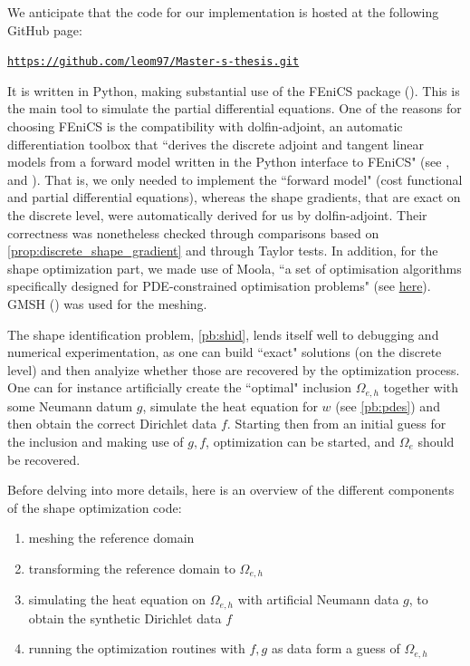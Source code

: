 \documentclass[english,a4paper,10pt,oneside]{scrbook}	%
\theoremstyle{break}
\theoremstyle{remark}
\begin{document}
We anticipate that the code for our implementation is hosted at the following GitHub page: 
\begin{center}
\href{https://github.com/leom97/Master-s-thesis.git}{\texttt{https://github.com/leom97/Master-s-thesis.git}}
\end{center}
It is written in Python, making substantial use of the FEniCS package (\cite{fenics}). This is the main tool to simulate the partial differential equations. One of the reasons for choosing FEniCS is the compatibility with dolfin-adjoint, an automatic differentiation toolbox that ``derives the discrete adjoint and tangent linear models from a forward model written in the Python interface to FEniCS" (see \cite{dolfin-adjoint_1}, \cite{dolfin-adjoint_2} and \cite{dolfin-adjoint_3}). That is, we only needed to implement the ``forward model" (cost functional and partial differential equations), whereas the shape gradients, that are exact on the discrete level, were automatically derived for us by dolfin-adjoint. Their correctness was nonetheless checked through comparisons based on \cref{prop:discrete_shape_gradient} and through Taylor tests. In addition, for the shape optimization part, we made use of Moola, ``a set of optimisation algorithms specifically designed for PDE-constrained optimisation problems" (see \href{https://github.com/funsim/moola}{here}). GMSH (\cite{gmsh}) was used for the meshing.

The shape identification problem, \cref{pb:shid}, lends itself well to debugging and numerical experimentation, as one can build ``exact" solutions (on the discrete level) and then analyize whether those are recovered by the optimization process. One can for instance artificially create the ``optimal" inclusion $\Omega_{e,h}$ together with some Neumann datum $g$, simulate the heat equation for $w$ (see \cref{pb:pdes}) and then obtain the correct Dirichlet data $f$. Starting then from an initial guess for the inclusion and making use of $g,f$, optimization can be started, and $\Omega_e$ should be recovered.

Before delving into more details, here is an overview of the different components of the shape optimization code:
\begin{enumerate}
	\item meshing the reference domain
	\item transforming the reference domain to $\Omega_{e,h}$
	\item simulating the heat equation on $\Omega_{e,h}$ with artificial Neumann data $g$, to obtain the synthetic Dirichlet data $f$
	\item running the optimization routines with $f,g$ as data form a guess of $\Omega_{e,h}$
\end{enumerate}
\end{document}
